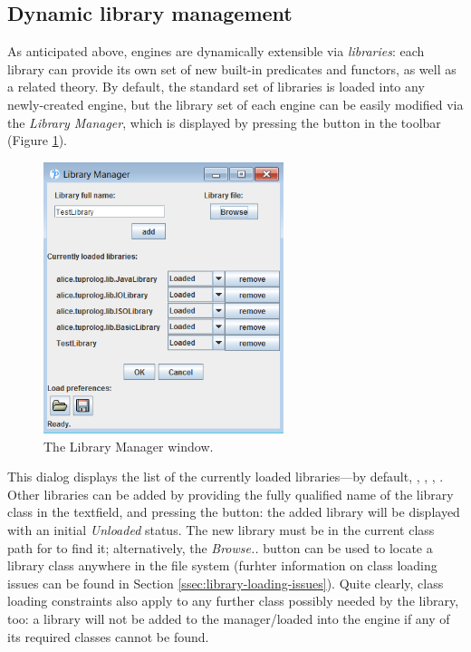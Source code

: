 \subsection{Dynamic library management}
\label{ssec:dynamic-library-management}

As anticipated above, \tuprolog{} engines are dynamically extensible via \textit{libraries}: each library can provide its own set of new built-in
predicates and functors, as well as a related theory.
%
By default, the standard set of libraries is loaded into any newly-created engine, but the library set of each engine can be easily modified via the \textit{Library Manager}, which is displayed by pressing the  button in the toolbar (Figure \ref{fig:gui-library-manager}).

\begin{figure}
\centering
\includegraphics[width=7cm]{images/gui-library-manager}
\caption{The Library Manager window.}
\label{fig:gui-library-manager}
\end{figure}

This dialog displays the list of the currently loaded libraries---by default,
, , , .
%
Other libraries can be added by providing the fully qualified name of the library class in the textfield, and pressing the  button: the added library will be displayed with an initial \textit{Unloaded} status.
The new library must be in the current class path for \tuprolog{} to find it; alternatively, the \textit{Browse..} button can be used to locate a library class anywhere in the file system (furhter information on class loading issues can be found in Section \ref{ssec:library-loading-issues}).
%
Quite clearly, class loading constraints also apply to any further class possibly needed by the library, too: a library will not be added to the manager/loaded into the engine if any of its required classes cannot be found.

